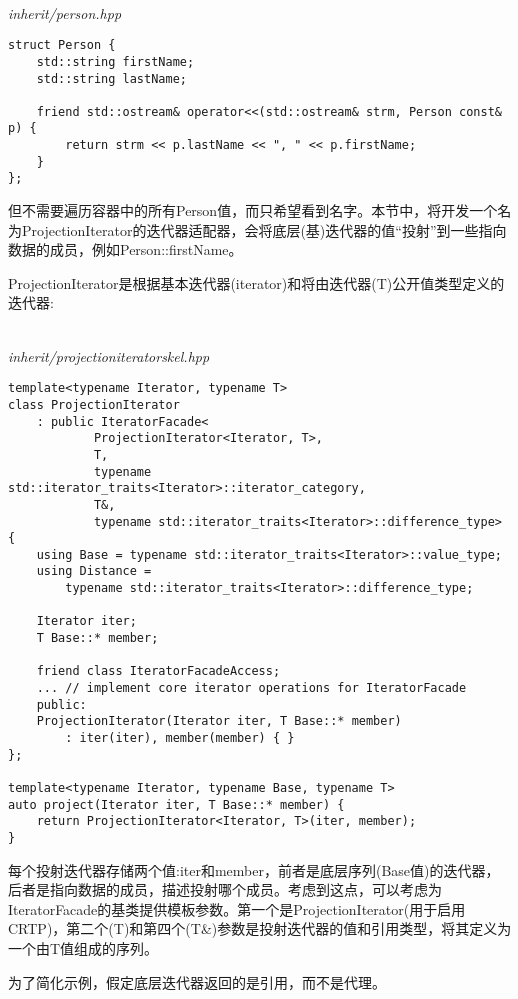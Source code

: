 \hspace*{\fill} \\ %
\noindent
\textit{inherit/person.hpp}
\begin{lstlisting}[style=styleCXX]
struct Person {
	std::string firstName;
	std::string lastName;
	
	friend std::ostream& operator<<(std::ostream& strm, Person const& p) {
		return strm << p.lastName << ", " << p.firstName;
	}
};
\end{lstlisting}

但不需要遍历容器中的所有Person值，而只希望看到名字。本节中，将开发一个名为ProjectionIterator的迭代器适配器，会将底层(基)迭代器的值“投射”到一些指向数据的成员，例如Person::firstName。

ProjectionIterator是根据基本迭代器(iterator)和将由迭代器(T)公开值类型定义的迭代器:

\hspace*{\fill} \\ %
\noindent
\textit{inherit/projectioniteratorskel.hpp}
\begin{lstlisting}[style=styleCXX]
template<typename Iterator, typename T>
class ProjectionIterator
	: public IteratorFacade<
			ProjectionIterator<Iterator, T>,
			T,
			typename std::iterator_traits<Iterator>::iterator_category,
			T&,
			typename std::iterator_traits<Iterator>::difference_type>
{
	using Base = typename std::iterator_traits<Iterator>::value_type;
	using Distance =
		typename std::iterator_traits<Iterator>::difference_type;
	
	Iterator iter;
	T Base::* member;
	
	friend class IteratorFacadeAccess;
	... // implement core iterator operations for IteratorFacade
	public:
	ProjectionIterator(Iterator iter, T Base::* member)
		: iter(iter), member(member) { }
};

template<typename Iterator, typename Base, typename T>
auto project(Iterator iter, T Base::* member) {
	return ProjectionIterator<Iterator, T>(iter, member);
}
\end{lstlisting}

每个投射迭代器存储两个值:iter和member，前者是底层序列(Base值)的迭代器，后者是指向数据的成员，描述投射哪个成员。考虑到这点，可以考虑为IteratorFacade的基类提供模板参数。第一个是ProjectionIterator(用于启用CRTP)，第二个(T)和第四个(T\&)参数是投射迭代器的值和引用类型，将其定义为一个由T值组成的序列。

\begin{tcolorbox}[colback=webgreen!5!white,colframe=webgreen!75!black]
\hspace*{0.75cm}为了简化示例，假定底层迭代器返回的是引用，而不是代理。
\end{tcolorbox}

